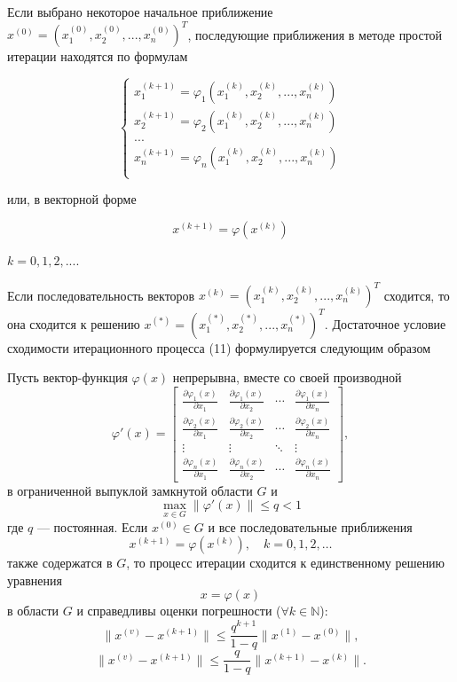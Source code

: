 Если выбрано некоторое начальное приближение $x^{(0)} = (x_1^{(0)}, x_2^{(0)}, ..., x_n^{(0)})^T$, 
последующие приближения в методе простой итерации находятся по формулам

\begin{equation}\label{eq:pythagoras}
    \begin{cases}
        x_1^{(k + 1)} = \varphi_1 (x_1^{(k)}, x_2^{(k)}, ..., x_n^{(k)}) \\
        x_2^{(k + 1)} = \varphi_2 (x_1^{(k)}, x_2^{(k)}, ..., x_n^{(k)}) \\
        ... \\
        x_n^{(k + 1)} = \varphi_n (x_1^{(k)}, x_2^{(k)}, ..., x_n^{(k)}) \\
    \end{cases}
\end{equation}

или, в векторной форме

\begin{equation}\label{eq:pythagoras}
    x^{(k + 1)} = \varphi(x^{(k)})
\end{equation}

$k = 0, 1, 2, ...$.

Если последовательность векторов $x^{(k)} = (x_1^{(k)}, x_2^{(k)}, ..., x_n^{(k)})^T$ сходится, то она сходится к
решению $x^{(*)} = (x_1^{(*)}, x_2^{(*)}, ..., x_n^{(*)})^T$. Достаточное условие сходимости итерационного процесса (11) формулируется
следующим образом

\begin{theorem}
Пусть вектор-функция $\varphi(x)$ непрерывна, вместе со своей производной
\[
\varphi'(x) =
\begin{bmatrix}
\frac{\partial \varphi_1(x)}{\partial x_1} & \frac{\partial \varphi_1(x)}{\partial x_2} & \cdots & \frac{\partial \varphi_1(x)}{\partial x_n} \\
\frac{\partial \varphi_2(x)}{\partial x_1} & \frac{\partial \varphi_2(x)}{\partial x_2} & \cdots & \frac{\partial \varphi_2(x)}{\partial x_n} \\
\vdots & \vdots & \ddots & \vdots \\
\frac{\partial \varphi_n(x)}{\partial x_1} & \frac{\partial \varphi_n(x)}{\partial x_2} & \cdots & \frac{\partial \varphi_n(x)}{\partial x_n}
\end{bmatrix},
\]
в ограниченной выпуклой замкнутой области $G$ и
\[
\max_{x \in G} \|\varphi'(x)\| \leq q < 1
\]
где $q$ — постоянная. Если $x^{(0)} \in G$ и все последовательные приближения
\[
x^{(k+1)} = \varphi(x^{(k)}), \quad k = 0,1,2,\ldots
\]
также содержатся в $G$, то процесс итерации сходится к единственному решению уравнения
\[
x = \varphi(x)
\]
в области $G$ и справедливы оценки погрешности ($\forall k \in \mathbb{N}$):
\[
\|x^{(v)} - x^{(k+1)}\| \leq \frac{q^{k+1}}{1-q} \|x^{(1)} - x^{(0)}\|,
\]
\[
\|x^{(v)} - x^{(k+1)}\| \leq \frac{q}{1-q} \|x^{(k+1)} - x^{(k)}\|.
\]
\end{theorem}


